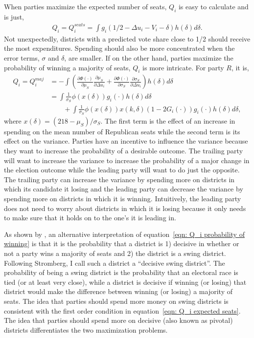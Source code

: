 \documentclass[12pt,final,fleqn]{article}
\theoremstyle{plain}
\begin{document}
When parties maximize the expected number of seats, $Q_i$ is easy to calculate and is just, 
\begin{align} \label{eqn: Q_i expected seats}
Q_i = Q_i^{seats} = \int  g_i(1/2 - \Delta u_i - V_i - \delta) h(\delta) d\delta.
\end{align}
Not unexpectedly, districts with a predicted vote share close to 1/2 should receive the most expenditures. Spending should also be more concentrated when the error terms, $\sigma$ and $\delta$, are smaller. If on the other hand, parties maximize the probability of winning a majority of seats, $Q_i$ is more intricate. For party $R$, it is,
\begin{align} \label{eqn: Q_i probability of winning}
Q_i  = Q_i^{maj} &= - \int \left(\frac{\partial \Phi(\cdot)}{\partial \mu_S}\frac{\partial \mu_S}{\partial \Delta u_i}+\frac{\partial \Phi(\cdot)}{\partial \sigma_S}\frac{\partial \sigma_S}{\partial \Delta u_i}\right)h(\delta)d\delta  \\
& = \int \frac{1}{\sigma_S}\phi(x(\delta))g_i(\cdot)h(\delta)d\delta \nonumber \\
 &\qquad + \int \frac{1}{\sigma_S}\phi(x(\delta))x(k, \delta)\left(1-2G_i(\cdot)\right) g_i(\cdot)h(\delta)d\delta,
\end{align}
where $x(\delta) = \left(218 - \mu_S\right)/\sigma_S$. The first term is the effect of an increase in spending on the mean number of Republican seats while the second term is its effect on the variance. Parties have an incentive to influence the variance because they want to increase the probability of a desirable outcome. The trailing party will want to increase the variance to increase the probability of a major change in the election outcome while the leading party will want to do just the opposite. The trailing party can increase the variance by spending more on districts in which its candidate it losing and the leading party can decrease the variance by spending more on districts in which it is winning. Intuitively, the leading party does not need to worry about districts in which it is losing because it only needs to make sure that it holds on to the one's it is leading in.

As shown by \citet{stromberg2008electoral}, an alternative interpretation of equation~\ref{eqn: Q_i probability of winning} is that it is the probability that a district is 1) decisive in whether or not a party wins a majority of seats and 2) the district is a swing district. Following Stromberg, I call such a district a ``decisive swing district''. The probability of being a swing district is the probability that an electoral race is tied (or at least very close), while a district is decisive if winning (or losing) that district would make the difference between winning (or losing) a majority of seats. The idea that parties should spend more money on swing districts is consistent with the first order condition in equation~\ref{eqn: Q_i expected seats}. The idea that parties should spend more on decisive (also known as pivotal) districts differentiates the two maximization problems.
\end{document}
